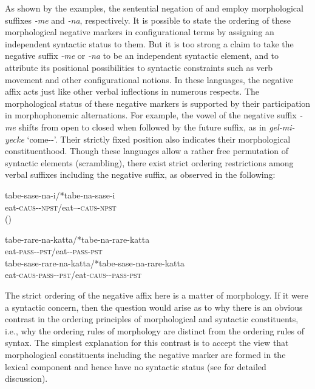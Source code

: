 \documentclass[output=paper,biblatex,babelshorthands,newtxmath,draftmode,colorlinks,citecolor=brown]{langscibook}
\begin{document}
\begin{exe}
\begin{xlist}
\begin{exe}
\begin{xlist}
\noindent
As shown by the examples, the sentential negation of  and  employ
morphological suffixes \textit{-me} and \textit{-na}, respectively.  It is possible to state the
ordering of these morphological negative markers in configurational terms by assigning an
independent syntactic status to them.  But it is too strong a claim to take the negative suffix
\textit{-me} or \textit{-na} to be an independent syntactic element, and to attribute its positional
possibilities to syntactic constraints such as verb movement and other configurational notions.  In
these languages, the negative affix acts just like other verbal inflections in numerous respects.
The morphological status of these negative markers is supported by their participation in
morphophonemic alternations.  For example, the vowel of the  negative suffix
\textit{-me} shifts from open to closed when followed by the future suffix, as in
\textit{gel-mi-yecke} `come-\NEG-\FUT'.  Their strictly fixed position also indicates their
morphological constituenthood. Though these languages allow a rather free permutation of syntactic
elements (scrambling), there exist strict ordering restrictions among verbal suffixes including the
negative suffix, as observed in the following:

\eal
\ex
\gll tabe-sase-na-i/*tabe-na-sase-i \\
     eat-\textsc{caus}-\NEG-\textsc{npst}/eat--\NEG-\textsc{caus}-\textsc{npst} \\\hfill()

\ex
\gll tabe-rare-na-katta/*tabe-na-rare-katta \\
     eat-\textsc{pass}-\NEG-\textsc{pst}/eat-\NEG-\textsc{pass}-\textsc{pst} \\

\ex
\gll tabe-sase-rare-na-katta/*tabe-sase-na-rare-katta \\
     eat-\textsc{caus}-\textsc{pass}-\NEG-\textsc{pst}/eat-\textsc{caus}-\NEG-\textsc{pass}-\textsc{pst}\\
\zl

\noindent
The strict ordering of the negative affix here is a matter of morphology.
If it were a syntactic concern, then
the question would arise as to why
there is an obvious contrast in the ordering principles
of morphological and syntactic constituents, i.e., why the ordering
rules of morphology are distinct from the ordering rules of syntax. The
simplest explanation for this contrast is to accept
the view that morphological constituents including the negative marker
are formed in the lexical component and hence have no syntactic
status (see \citealt[Chapter~2]{Kim:00} for detailed discussion).


\end{xlist}
\end{exe}
\end{xlist}
\end{exe}
\end{document}
